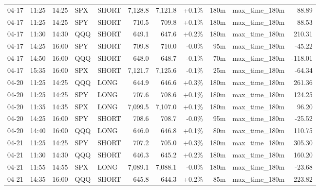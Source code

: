 \documentclass[11pt,a4paper,twoside]{article}
\begin{document}
\begin{center}
\begin{longtable}{>{\color{txtmain}}l l l l l r r r r >{\color{txtmain}}l r}
04-17 & 11:25 & 14:25 & SPX & SHORT & 7,128.8 & 7,121.8 & \textcolor{wingreen}{+0.1\%} & 180m & max\_time\_180m & \textcolor{wingreen}{88.89} \\
04-17 & 11:25 & 14:25 & SPY & SHORT & 710.5 & 709.8 & \textcolor{wingreen}{+0.1\%} & 180m & max\_time\_180m & \textcolor{wingreen}{88.53} \\
04-17 & 11:30 & 14:30 & QQQ & SHORT & 649.1 & 647.6 & \textcolor{wingreen}{+0.2\%} & 180m & max\_time\_180m & \textcolor{wingreen}{210.31} \\
04-17 & 14:25 & 16:00 & SPY & SHORT & 709.8 & 710.0 & \textcolor{lossred}{-0.0\%} & 95m & max\_time\_180m & \textcolor{lossred}{-45.22} \\
04-17 & 14:50 & 16:00 & QQQ & SHORT & 648.0 & 648.7 & \textcolor{lossred}{-0.1\%} & 70m & max\_time\_180m & \textcolor{lossred}{-118.01} \\
04-17 & 15:35 & 16:00 & SPX & SHORT & 7,121.7 & 7,125.6 & \textcolor{lossred}{-0.1\%} & 25m & max\_time\_180m & \textcolor{lossred}{-64.34} \\
04-20 & 11:25 & 14:25 & QQQ & LONG & 644.9 & 646.6 & \textcolor{wingreen}{+0.3\%} & 180m & max\_time\_180m & \textcolor{wingreen}{261.36} \\
04-20 & 11:25 & 14:25 & SPY & LONG & 707.6 & 708.6 & \textcolor{wingreen}{+0.1\%} & 180m & max\_time\_180m & \textcolor{wingreen}{124.25} \\
04-20 & 11:35 & 14:35 & SPX & LONG & 7,099.5 & 7,107.0 & \textcolor{wingreen}{+0.1\%} & 180m & max\_time\_180m & \textcolor{wingreen}{96.20} \\
04-20 & 14:25 & 16:00 & SPY & SHORT & 708.6 & 708.7 & \textcolor{lossred}{-0.0\%} & 95m & max\_time\_180m & \textcolor{lossred}{-25.52} \\
04-20 & 14:40 & 16:00 & QQQ & LONG & 646.0 & 646.8 & \textcolor{wingreen}{+0.1\%} & 80m & max\_time\_180m & \textcolor{wingreen}{110.75} \\
04-21 & 11:25 & 14:25 & SPY & SHORT & 707.2 & 705.0 & \textcolor{wingreen}{+0.3\%} & 180m & max\_time\_180m & \textcolor{wingreen}{305.30} \\
04-21 & 11:30 & 14:30 & QQQ & SHORT & 646.3 & 645.2 & \textcolor{wingreen}{+0.2\%} & 180m & max\_time\_180m & \textcolor{wingreen}{160.20} \\
04-21 & 11:55 & 14:55 & SPX & LONG & 7,089.1 & 7,088.1 & \textcolor{lossred}{-0.0\%} & 180m & max\_time\_180m & \textcolor{lossred}{-23.68} \\
04-21 & 14:35 & 16:00 & QQQ & SHORT & 645.8 & 644.3 & \textcolor{wingreen}{+0.2\%} & 85m & max\_time\_180m & \textcolor{wingreen}{223.82} \\

\end{longtable}
\end{center}
\end{document}
